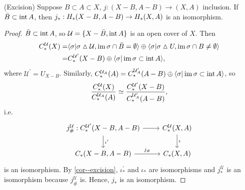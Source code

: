 \documentclass[a4paper,11pt]{article}
\begin{document}
				\begin{thm}(Excision)
					Suppose $B\subset A\subset X$, $j:(X- B,A- B)\rightarrow (X,A)$ inclusion. If $\bar{B}\subset\operatorname{int} A$, then $j_\ast:H_{\ast}(X- B,A- B)\rightarrow H_{\ast}(X,A)$ is an isomorphism.
				\end{thm}
				\begin{proof}
					$\bar{B}\subset\operatorname{int} A$, so $\mathcal{U}=\{X-\bar{B}, \operatorname{int} A\}$ is an open cover of $X$. Then
					\begin{align*}
						C_{\ast}^{\mathcal{U}}(X)=&\langle \sigma|\sigma\vartriangle\mathcal{U},\operatorname{im}\sigma\cap\bar{B}=\emptyset\rangle\oplus\langle \sigma|\sigma\vartriangle U,\operatorname{im}\sigma\cap B\neq\emptyset\rangle\\
						=&C_{\ast}^{\mathcal{U}^{\prime}}(X- B)\oplus\langle \sigma|\operatorname{im}\sigma\subset\operatorname{int} A\rangle,
					\end{align*}
					where $\mathcal{U}^{\prime}=U_{X- B}$.
					Similarly, $C_{\ast}^{\mathcal{U}_A}(A)=C_{\ast}^{\mathcal{U}_A^{\prime}}(A- B)\oplus\langle \sigma|\operatorname{im}\sigma\subset\operatorname{int} A\rangle$, so
					\begin{equation*}
						\frac{C_{\ast}^{\mathcal{U}}(X)}{C_{\ast}^{\mathcal{U}_A}(A)}\simeq\frac{C_{\ast}^{\mathcal{U}^{\prime}}(X- B)}{C_{\ast}^{\mathcal{U}_A^{\prime}}(A- B)},
					\end{equation*}
					i.e. 
					\begin{equation*}
						\begin{tikzcd}
							j_\#^\mathcal{U}:\scx{^{\prime}}{X- B,A- B}\ar[d,"\iota^{\prime}"]\ar[r]& \scx{}{X,A}\ar[d,"\iota"]\\
							\cx{X- B,A- B}\ar[r,"j_\#"]& \cx{X,A}
						\end{tikzcd}
					\end{equation*}
					is an isomorphism. By \autoref{cor--excision}, $\iota_\ast^{\prime}$ and $\iota_\ast$ are isomorphisms and $j_\ast^\mathcal{U}$ is an isomorphism because $j_\#^\mathcal{U}$ is. Hence, $j_\ast$ is an isomorphism.
				\end{proof}
\end{document}

